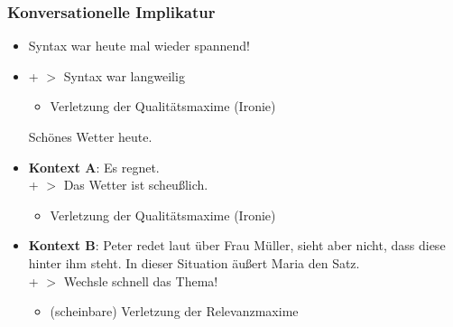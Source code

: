 
\begin{frame}
\frametitle{Konversationelle Implikatur}

\begin{itemize}
	\item[]

	\ea Syntax war heute mal wieder spannend!
	\z

	\item[] + $>$ Syntax war langweilig

	\begin{itemize}
		\item Verletzung der Qualitätsmaxime (Ironie)
	\end{itemize}

	\ea Schönes Wetter heute.
	\z

		\item[] \textbf{Kontext A}: Es regnet.\\
+ $>$ Das Wetter ist scheu\ss{}lich. 

		\begin{itemize}
			\item Verletzung der Qualitätsmaxime (Ironie)
		\end{itemize}
	
		\item[] \textbf{Kontext B}: Peter redet laut über Frau Müller, sieht aber nicht, dass diese hinter ihm steht. In dieser Situation äu\ss{}ert Maria den Satz.\\
+ $>$ Wechsle schnell das Thema! 
		
		\begin{itemize}
			\item (scheinbare) Verletzung der Relevanzmaxime
		\end{itemize}	
		
	\end{itemize}

\end{frame}



